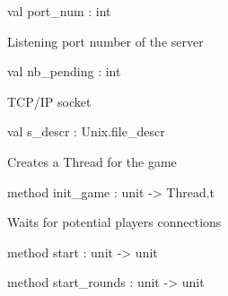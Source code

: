 \documentclass[11pt]{article}
\begin{document}
\begin{ocamldocobjectend}


\label{val:Server2.server.port-underscorenum}\begin{ocamldoccode}
val port_num : int
\end{ocamldoccode}
\begin{ocamldocdescription}
Listening port number of the server


\end{ocamldocdescription}


\label{val:Server2.server.nb-underscorepending}\begin{ocamldoccode}
val nb_pending : int
\end{ocamldoccode}
\begin{ocamldocdescription}
TCP/IP socket


\end{ocamldocdescription}


\label{val:Server2.server.s-underscoredescr}\begin{ocamldoccode}
val s_descr : Unix.file_descr
\end{ocamldoccode}
\begin{ocamldocdescription}
Creates a Thread for the game


\end{ocamldocdescription}


\label{method:Server2.server.init-underscoregame}\begin{ocamldoccode}
method init_game : unit -> Thread.t
\end{ocamldoccode}
\begin{ocamldocdescription}
Waits for potential players connections


\end{ocamldocdescription}


\label{method:Server2.server.start}\begin{ocamldoccode}
method start : unit -> unit
\end{ocamldoccode}


\label{method:Server2.server.start-underscorerounds}\begin{ocamldoccode}
method start_rounds : unit -> unit
\end{ocamldoccode}
\end{ocamldocobjectend}
\end{document}
